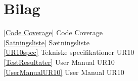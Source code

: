 \chapter{Bilag}\label{Bilag}
\ref{Code Coverage} Code Coverage			\\					
\ref{Satningsliste} Sætningsliste 				\\
\ref{UR10spec} Tekniske specifikationer UR10		\\
\ref{TestResultater}  User Manual UR10 		\\
\ref{UserManualUR10}  User Manual UR10 						
